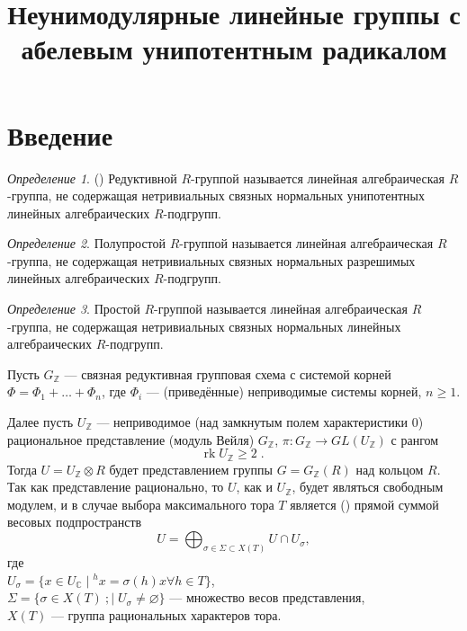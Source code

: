\documentclass[10pt]{article}
\title{Неунимодулярные линейные группы с абелевым унипотентным радикалом}
\author{}
\date{}
\theoremstyle{remark}
\newtheorem{definition}{Определение}
\newcommand{\Z}{\mathbb{Z}}
\renewcommand{\C}{\mathbb{C}}
\renewcommand{\ge}{\geqslant}
\begin{document}
\maketitle


\section{Введение}


\begin{definition} (\cite{Conrad11reductivegroup})
Редуктивной $R$-группой называется линейная алгебраическая $R$-группа, не содержащая нетривиальных связных нормальных унипотентных линейных алгебраических $R$-подгрупп.
\end{definition}

\begin{definition}
Полупростой $R$-группой называется линейная алгебраическая $R$-группа, не содержащая нетривиальных связных нормальных разрешимых линейных алгебраических $R$-подгрупп.
\end{definition}

\begin{definition}
Простой $R$-группой называется линейная алгебраическая $R$-группа, не содержащая нетривиальных связных нормальных линейных алгебраических $R$-подгрупп.
\end{definition}

Пусть $G_\Z$ --- связная редуктивная групповая схема с системой корней $\Phi = \Phi_1 + \dots + \Phi_n$, где $\Phi_i$ --- (приведённые) неприводимые системы корней, $n \ge 1$.

Далее пусть $U_\Z$ --- неприводимое (над замкнутым полем характеристики $0$) рациональное представление (модуль Вейля) $G_\Z$, $\pi:G_\Z \to GL(U_\Z)$ с рангом
\begin{equation}\label{representationrank}\mathrm{rk} \; U_\Z \ge 2 \;. \end{equation}
Тогда $U=U_\Z\otimes R$ будет представлением группы $G=G_\Z(R)$ над кольцом $R$. Так как представление рационально, то $U$, как и $U_\Z$, будет являться свободным модулем, и в случае выбора максимального тора $T$ является (\citep{Borel1970}) прямой суммой весовых подпространств
$$U=\bigoplus_{\sigma \in \Sigma \subset X(T)} {U \cap U_\sigma} ,$$
где\\
$U_\sigma = \{x \in U_\C \; | \; ^h x = \sigma(h) x \forall h \in T \}$,\\
$\Sigma = \{\sigma \in X(T) \
; | \; U_\sigma \ne \varnothing\}$ --- множество весов представления,\\
$X(T)$ --- группа рациональных характеров тора.
\end{document}
